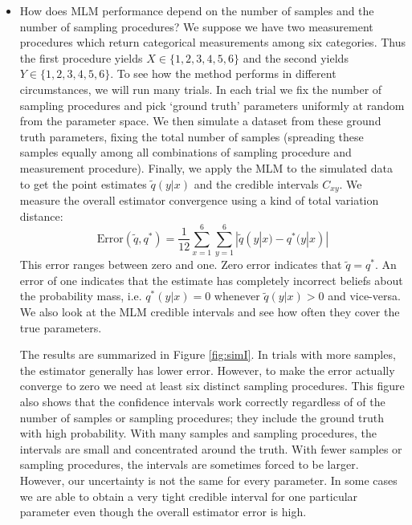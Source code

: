 \begin{itemize}
    \item How does MLM performance depend on the number of samples and the number of sampling procedures?  We suppose we have two measurement procedures which return categorical measurements among six categories.  Thus the first procedure yields $X\in \{1,2,3,4,5,6\}$ and the second yields $Y\in \{1,2,3,4,5,6\}$.  To see how the method performs in different circumstances, we will run many trials.  In each trial we fix the number of sampling procedures and pick `ground truth' parameters uniformly at random from the parameter space.  We then simulate a dataset from these ground truth parameters, fixing the total number of samples (spreading these samples equally among all combinations of sampling procedure and measurement procedure).  Finally, we apply the MLM to the simulated data to get the point estimates $\tilde q(y|x)$ and the credible intervals $C_{x y}$.  We measure the overall estimator convergence using a kind of total variation distance:
    \[
    \mathrm{Error}(\tilde q,q^*)=\frac{1}{12}\sum_{x=1}^{6}\sum_{y=1}^{6} |\tilde q(y|x) - q^*(y|x)|
    \]
    This error ranges between zero and one.  Zero error indicates that $\tilde q=q^*$. An error of one indicates that the estimate has completely incorrect beliefs about the probability mass, i.e. $q^*(y|x)=0$ whenever $\tilde q(y|x)>0$ and vice-versa.  We also look at the MLM credible intervals and see how often they cover the true parameters.  

    The results are summarized in Figure \ref{fig:simI}.  In trials with more samples, the estimator generally has lower error.  However, to make the error actually converge to zero we need at least six distinct sampling procedures.  This figure also shows that the confidence intervals work correctly regardless of of the number of samples or sampling procedures; they include the ground truth with high probability.   With many samples and sampling procedures, the intervals are small and concentrated around the truth.  With fewer samples or sampling procedures, the intervals are sometimes forced to be larger.  However, our uncertainty is not the same for every parameter.  In some cases we are able to obtain a very tight credible interval for one particular parameter even though the overall estimator error is high.  


\end{itemize}
